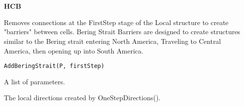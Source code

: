 \documentclass[a4paper]{book}
\begin{document}
\chapter*{}
\begin{center}
{\textbf{\huge HCB}}
\par\bigskip{\large \today}
\end{center}
\begin{description}
\raggedright{}
\item[Title]
\item[Version]
\item[Description]
\item[License]
\item[Encoding]
\item[LazyData]
\item[RoxygenNote]
\item[Imports]
\end{description}
%
\begin{Description}\relax
Removes connections at the FirstStep stage of the Local structure to create "barriers" between cells.  Bering Strait Barriers are designed to create structures similar to the Bering strait entering North America, Traveling to Central America, then opening up into South America.
\end{Description}
%
\begin{Usage}
\begin{verbatim}
AddBeringStrait(P, firstStep)
\end{verbatim}
\end{Usage}
%
\begin{Arguments}
\begin{ldescription}
\item[\code{P}] A list of parameters.

\item[\code{firstStep}] The local directions created by OneStepDirections().
\end{ldescription}
\end{Arguments}
\end{document}

